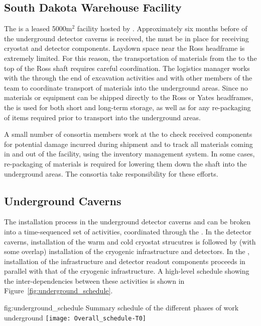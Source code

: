 \subsection{South Dakota Warehouse Facility}
\label{sec:sdwf}

The  is a leased 5000m$^2$ facility hosted by 
.  Approximately six months before 
of the underground detector caverns is received, the  
must be in place for receiving cryostat and detector 
components.  Laydown space near the Ross headframe is extremely 
limited.  For this reason, the transportation of materials from 
the  to the top of the Ross shaft requires careful 
coordination. The  logistics manager works 
with the  through the end of excavation activities  
and with other members of the  team to coordinate transport 
of materials into the underground areas.  Since no materials or 
equipment can be shipped directly to the Ross or Yates headframes, 
the  is used for both short and long-term storage, as 
well as for any re-packaging of items required prior to transport 
into the underground areas. 

A small number of  consortia members work at the
 to check received components for potential damage
incurred during shipment and to track all materials coming in and out of
the facility, using the inventory management system.  In some cases,
re-packaging of materials is required for lowering them down the shaft
into the underground areas.  The  consortia take
responsibility for these efforts.

\subsection{Underground Caverns}

The installation 
process in the underground detector caverns and  can 
be broken into a time-sequenced set of activities, coordinated 
through the .  In the detector caverns, installation 
of the warm and cold cryostat strucutres is followed by (with 
some overlap) installation of the cryogenic infrastructure and 
detectors.  In the , installation of the   
infrastructure and detector readout components proceeds in 
parallel with that of the cryogenic infrastructure.  A high-level 
schedule showing the inter-dependencies between these activities 
is shown in Figure~\ref{fig:underground_schedule}.
\begin{dunefigure}{fig:underground_schedule}
  {Summary schedule of the different phases of work underground}
  \texttt{[image: Overall\_schedule-T0]}
\end{dunefigure}


